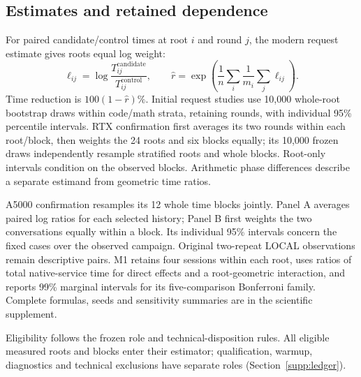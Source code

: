 \subsection{Estimates and retained dependence}
For paired candidate/control times at root $i$ and round $j$, the modern request estimate gives roots equal log weight:
\begin{equation}
 \ell_{ij}=\log\frac{T^{\mathrm{candidate}}_{ij}}{T^{\mathrm{control}}_{ij}},\qquad
 \widehat r=\exp\!\left(\frac1n\sum_i\frac1{m_i}\sum_j\ell_{ij}\right).
 \label{eq:estimator}
\end{equation}
Time reduction is $100(1-\widehat r)\%$. Initial request studies use 10,000 whole-root bootstrap draws within code/math strata, retaining rounds, with individual 95\% percentile intervals. RTX confirmation first averages its two rounds within each root/block, then weights the 24 roots and six blocks equally; its 10,000 frozen draws independently resample stratified roots and whole blocks. Root-only intervals condition on the observed blocks. Arithmetic phase differences describe a separate estimand from geometric time ratios.

A5000 confirmation resamples its 12 whole time blocks jointly. Panel A averages paired log ratios for each selected history; Panel B first weights the two conversations equally within a block. Its individual 95\% intervals concern the fixed cases over the observed campaign. Original two-repeat LOCAL observations remain descriptive pairs. M1 retains four sessions within each root, uses ratios of total native-service time for direct effects and a root-geometric interaction, and reports 99\% marginal intervals for its five-comparison Bonferroni family. Complete formulas, seeds and sensitivity summaries are in the scientific supplement.

Eligibility follows the frozen role and technical-disposition rules. All eligible measured roots and blocks enter their estimator; qualification, warmup, diagnostics and technical exclusions have separate roles (Section~\ref{supp:ledger}).
